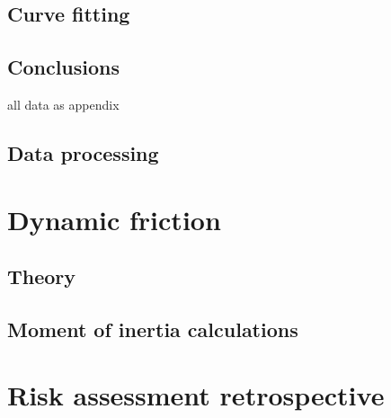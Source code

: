 \documentclass[12pt]{article}
\begin{document}
\subsection{Curve fitting}
\subsection{Conclusions}





all data as appendix 

\subsection{Data processing}

\section{Dynamic friction}



\subsection{Theory}

\subsection{Moment of inertia calculations}






\section{Risk assessment retrospective}
\end{document}
